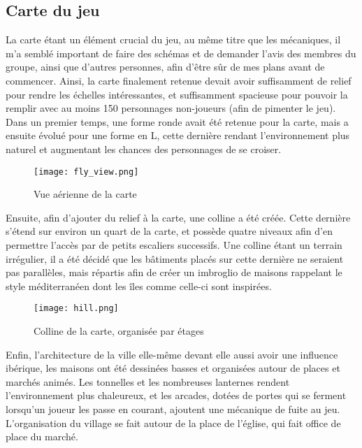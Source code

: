 \subsection{Carte du jeu}

La carte étant un élément crucial du jeu, au même titre que les mécaniques, 
il m’a semblé important de faire des schémas et de demander l’avis des membres 
du groupe, ainsi que d’autres personnes, afin d’être sûr de mes plans avant de 
commencer. Ainsi, la carte finalement retenue devait avoir suffisamment de 
relief pour rendre les échelles intéressantes, et suffisamment spacieuse pour 
pouvoir la remplir avec au moins 150 personnages non-joueurs (afin de pimenter le jeu).
Dans un premier temps, une forme ronde avait été retenue pour la carte, mais 
a ensuite évolué pour une forme en L, cette dernière rendant l’environnement 
plus naturel et augmentant les chances des personnages de se croiser.


\begin{figure}[hbt!]
    \centering
    \texttt{[image: fly\_view.png]}
    \caption{Vue aérienne de la carte}
\end{figure}

Ensuite, afin d’ajouter du relief à la carte, une colline a été créée. 
Cette dernière s’étend sur environ un quart de la carte, et possède quatre 
niveaux afin d’en permettre l’accès par de petits escaliers successifs. 
Une colline étant un terrain irrégulier, il a été décidé que les bâtiments 
placés sur cette dernière ne seraient pas parallèles, mais répartis afin de 
créer un imbroglio de maisons rappelant le style méditerranéen dont les îles 
comme celle-ci sont inspirées.


\begin{figure}[hbt!]
    \centering
    \texttt{[image: hill.png]}
    \caption{Colline de la carte, organisée par étages}
\end{figure}


Enfin, l’architecture de la ville elle-même devant elle aussi avoir une influence 
ibérique, les maisons ont été dessinées basses et organisées autour de places et 
marchés animés. Les tonnelles et les nombreuses lanternes rendent l’environnement 
plus chaleureux, et les arcades, dotées de portes qui se ferment lorsqu’un joueur 
les passe en courant, ajoutent une mécanique de fuite au jeu. L’organisation du 
village se fait autour de la place de l’église, qui fait office de place du marché.\\